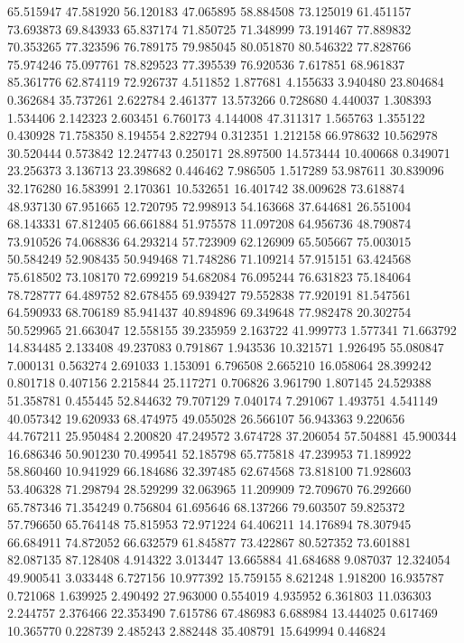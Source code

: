 65.515947
47.581920
56.120183
47.065895
58.884508
73.125019
61.451157
73.693873
69.843933
65.837174
71.850725
71.348999
73.191467
77.889832
70.353265
77.323596
76.789175
79.985045
80.051870
80.546322
77.828766
75.974246
75.097761
78.829523
77.395539
76.920536
7.617851
68.961837
85.361776
62.874119
72.926737
4.511852
1.877681
4.155633
3.940480
23.804684
0.362684
35.737261
2.622784
2.461377
13.573266
0.728680
4.440037
1.308393
1.534406
2.142323
2.603451
6.760173
4.144008
47.311317
1.565763
1.355122
0.430928
71.758350
8.194554
2.822794
0.312351
1.212158
66.978632
10.562978
30.520444
0.573842
12.247743
0.250171
28.897500
14.573444
10.400668
0.349071
23.256373
3.136713
23.398682
0.446462
7.986505
1.517289
53.987611
30.839096
32.176280
16.583991
2.170361
10.532651
16.401742
38.009628
73.618874
48.937130
67.951665
12.720795
72.998913
54.163668
37.644681
26.551004
68.143331
67.812405
66.661884
51.975578
11.097208
64.956736
48.790874
73.910526
74.068836
64.293214
57.723909
62.126909
65.505667
75.003015
50.584249
52.908435
50.949468
71.748286
71.109214
57.915151
63.424568
75.618502
73.108170
72.699219
54.682084
76.095244
76.631823
75.184064
78.728777
64.489752
82.678455
69.939427
79.552838
77.920191
81.547561
64.590933
68.706189
85.941437
40.894896
69.349648
77.982478
20.302754
50.529965
21.663047
12.558155
39.235959
2.163722
41.999773
1.577341
71.663792
14.834485
2.133408
49.237083
0.791867
1.943536
10.321571
1.926495
55.080847
7.000131
0.563274
2.691033
1.153091
6.796508
2.665210
16.058064
28.399242
0.801718
0.407156
2.215844
25.117271
0.706826
3.961790
1.807145
24.529388
51.358781
0.455445
52.844632
79.707129
7.040174
7.291067
1.493751
4.541149
40.057342
19.620933
68.474975
49.055028
26.566107
56.943363
9.220656
44.767211
25.950484
2.200820
47.249572
3.674728
37.206054
57.504881
45.900344
16.686346
50.901230
70.499541
52.185798
65.775818
47.239953
71.189922
58.860460
10.941929
66.184686
32.397485
62.674568
73.818100
71.928603
53.406328
71.298794
28.529299
32.063965
11.209909
72.709670
76.292660
65.787346
71.354249
0.756804
61.695646
68.137266
79.603507
59.825372
57.796650
65.764148
75.815953
72.971224
64.406211
14.176894
78.307945
66.684911
74.872052
66.632579
61.845877
73.422867
80.527352
73.601881
82.087135
87.128408
4.914322
3.013447
13.665884
41.684688
9.087037
12.324054
49.900541
3.033448
6.727156
10.977392
15.759155
8.621248
1.918200
16.935787
0.721068
1.639925
2.490492
27.963000
0.554019
4.935952
6.361803
11.036303
2.244757
2.376466
22.353490
7.615786
67.486983
6.688984
13.444025
0.617469
10.365770
0.228739
2.485243
2.882448
35.408791
15.649994
0.446824
